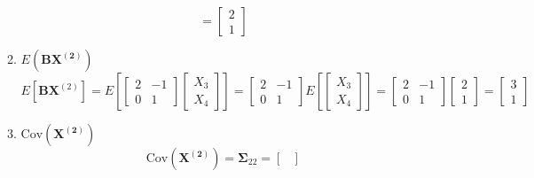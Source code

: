 \begin{enumerate}[font=\bfseries]
\begin{enumerate}
\[                =\begin{bmatrix}
                    2 \\
                    1
                \end{bmatrix}
            \]
            \item $E\left(\mathbf{B}\mathbf{X^{(2)}}\right)$
            \[
                E\left[\mathbf{B}\mathbf{X}^{(2)}\right]
                =
                E\left[
                    \begin{bmatrix}
                        2 & -1 \\
                        0 & 1
                    \end{bmatrix}
                    \begin{bmatrix}
                        X_3 \\
                        X_4
                    \end{bmatrix}
                \right]
                =
                \begin{bmatrix}
                    2 & -1 \\
                    0 & 1
                \end{bmatrix}
                E\left[
                    \begin{bmatrix}
                        X_3 \\
                        X_4
                    \end{bmatrix}
                \right]
                =
                \begin{bmatrix}
                    2 & -1 \\
                    0 & 1
                \end{bmatrix}
                \begin{bmatrix}
                    2 \\
                    1
                \end{bmatrix}
                =
                \begin{bmatrix}
                    3 \\
                    1
                \end{bmatrix}
            \]
            \item $\text{Cov}\left(\mathbf{X^{(2)}}\right)$
            \[
                \text{Cov}\left(\mathbf{X^{(2)}}\right)
                =
                \mathbf{\Sigma}_{22}
                =
                \begin{bmatrix}

\end{bmatrix}\]
\end{enumerate}
\end{enumerate}
